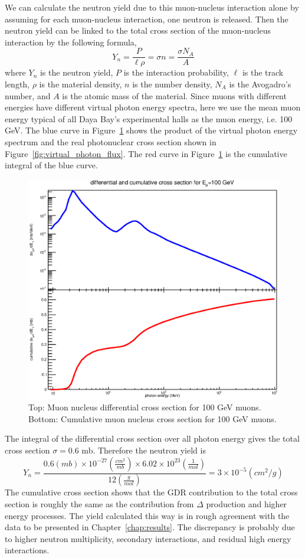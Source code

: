 We can calculate the neutron yield due to this muon-nucleus interaction alone by assuming for each muon-nucleus interaction, one neutron is released. Then the neutron yield can be linked to the total cross section of the muon-nucleus interaction by the following formula,
\begin{equation}
	Y_n=\frac{P}{\ell \rho}=\sigma n=\frac{\sigma N_A}{A}
\end{equation}
where $Y_n$ is the neutron yield, $P$ is the interaction probability, $\ell$ is the track length, $\rho$ is the material density, $n$ is the number density, $N_A$ is the Avogadro's number, and $A$ is the atomic mass of the material. Since muons with different energies have different virtual photon energy spectra, here we use the mean muon energy typical of all Daya Bay's experimental halls as the muon energy, i.e. 100 GeV. The blue curve in Figure~\ref{fig:folded_cross_section} shows the product of the virtual photon energy spectrum and the real photonuclear cross section shown in Figure~\ref{fig:virtual_photon_flux}. The red curve in Figure~\ref{fig:folded_cross_section} is the cumulative integral of the blue curve.
\begin{figure}
	\centering
	\includegraphics[width=.8\textwidth]{figures/chap6/muN_diff_cumul_cross_section.eps}
	\caption{Top: Muon nucleus differential cross section for 100 GeV muons. Bottom: Cumulative muon nucleus cross section for 100 GeV muons.}
	\label{fig:folded_cross_section}
\end{figure}
The integral of the differential cross section over all photon energy gives the total cross section $\sigma=0.6$ mb. Therefore the neutron yield is
\begin{equation}
	Y_n=\frac{0.6(mb)\times 10^{-27}\left(\frac{cm^2}{mb}\right)\times 6.02\times10^{23}\left(\frac{1}{mol}\right)}{12\left(\frac{g}{mol}\right)}=3\times 10^{-5} (cm^2/g)
\end{equation}
The cumulative cross section shows that the GDR contribution to the total cross section is roughly the same as the contribution from $\Delta$ production and higher energy processes. The yield calculated this way is in rough agreement with the data to be presented in Chapter~\ref{chap:results}. The discrepancy is probably due to higher neutron multiplicity, secondary interactions, and residual high energy interactions.